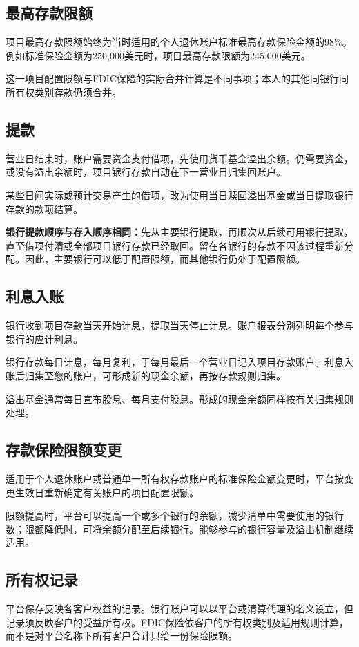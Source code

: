 \documentclass[UTF8,fontset=none,11pt,a4paper]{ctexart}
\begin{document}
\subsection*{最高存款限额}
项目最高存款限额始终为当时适用的个人退休账户标准最高存款保险金额的98\%。例如标准保险金额为250,000美元时，项目最高存款限额为245,000美元。


这一项目配置限额与FDIC保险的实际合并计算是不同事项；本人的其他同银行同所有权类别存款\allowbreak\mbox{仍须合并。}


\subsection*{提款}
营业日结束时，账户需要资金支付借项，先使用货币基金溢出余额。仍需要资金，或没有溢出余额时，项目银行存款自动在下一营业日归\allowbreak\mbox{集回账户。}


某些日间实际或预计交易产生的借项，改为使用当日赎回溢出基金或当日提取银行存款的\allowbreak\mbox{款项结算。}


\textbf{银行提款顺序与存入顺序相同：}先从主要银行提取，再顺次从后续可用银行提取，直至借项付清或全部项目银行存款已经取回。留在各银行的存款不因该过程重新分配。因此，主要银行可以低于配置限额，而其他银行仍处于\allowbreak\mbox{配置限额。}


\subsection*{利息入账}
银行收到项目存款当天开始计息，提取当天停止计息。账户报表分别列明每个参与银行的\allowbreak\mbox{应计利息。}


银行存款每日计息，每月复利，于每月最后一个营业日记入项目存款账户。利息入账后归集至您的账户，可形成新的现金余额，再按存款\allowbreak\mbox{规则归集。}


溢出基金通常每日宣布股息、每月支付股息。形成的现金余额同样按有关归集\allowbreak\mbox{规则处理。}


\subsection*{存款保险限额变更}
适用于个人退休账户或普通单一所有权存款账户的标准保险金额变更时，平台按变更生效日重新确定有关账户的项目\allowbreak\mbox{配置限额。}


限额提高时，平台可以提高一个或多个银行的余额，减少清单中需要使用的银行数；限额降低时，可将余额分配至后续银行。能够参与的银行容量及溢出机制\allowbreak\mbox{继续适用。}


\subsection*{所有权记录}
平台保存反映各客户权益的记录。银行账户可以以平台或清算代理的名义设立，但记录须反映客户的受益所有权。FDIC保险依客户的所有权类别及适用规则计算，而不是对平台名称下所有客户合计只给一份\allowbreak\mbox{保险限额。}
\end{document}
